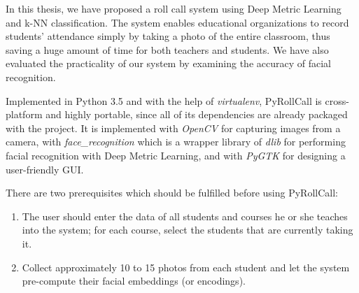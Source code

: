 In this thesis, we have proposed a roll call system using Deep Metric Learning and k-NN classification.
The system enables educational organizations to record students' attendance simply by taking a photo of
the entire classroom, thus saving a huge amount of time for both teachers and students.
We have also evaluated the practicality of our system by examining the accuracy of facial recognition.
\vspace{0.5cm}

Implemented in Python 3.5 and with the help of \emph{virtualenv}, PyRollCall is cross-platform and highly portable,
since all of its dependencies are already packaged with the project. It is implemented with \emph{OpenCV}
for capturing images from a camera, with \emph{face\_recognition} which is a wrapper library of \emph{dlib}
for performing facial recognition with Deep Metric Learning, and with \emph{PyGTK} for designing a user-friendly GUI.
\vspace{0.5cm}

There are two prerequisites which should be fulfilled before using PyRollCall:

\begin{enumerate}
  \item The user should enter the data of all students and courses he or she teaches into the system; for each course, select the students that are currently taking it.
  \item Collect approximately 10 to 15 photos from each student and let the system pre-compute their facial embeddings (or encodings).
\end{enumerate}
